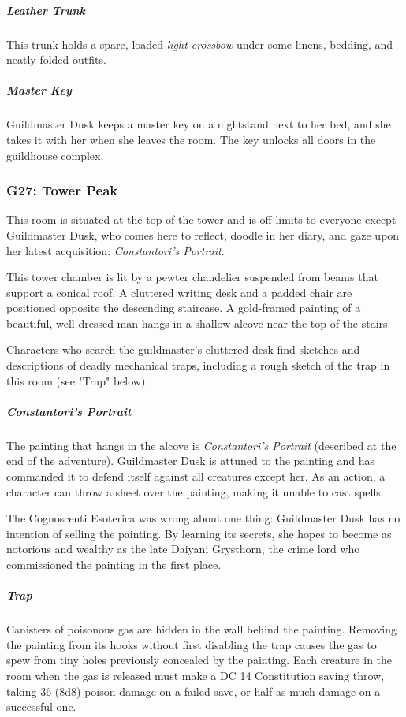 \documentclass[10pt,a4paper,twoside,bg=print,twocolumn,openany,nodeprecatedcode]{dndbook}
\begin{document}
\subparagraph{Leather Trunk}
This trunk holds a spare, loaded \textit{light crossbow} under some linens, bedding, and neatly folded outfits.

\subparagraph{Master Key}
Guildmaster Dusk keeps a master key on a nightstand next to her bed, and she takes it with her when she leaves the room. The key unlocks all doors in the guildhouse complex.

\subsubsection{G27: Tower Peak}
This room is situated at the top of the tower and is off limits to everyone except Guildmaster Dusk, who comes here to reflect, doodle in her diary, and gaze upon her latest acquisition: \textit{Constantori's Portrait}.

\begin{DndReadAloud}{}
This tower chamber is lit by a pewter chandelier suspended from beams that support a conical roof. A cluttered writing desk and a padded chair are positioned opposite the descending staircase. A gold-framed painting of a beautiful, well-dressed man hangs in a shallow alcove near the top of the stairs.

\end{DndReadAloud}

Characters who search the guildmaster's cluttered desk find sketches and descriptions of deadly mechanical traps, including a rough sketch of the trap in this room (see "Trap" below).

\subparagraph{Constantori's Portrait}
The painting that hangs in the alcove is \textit{Constantori's Portrait} (described at the end of the adventure). Guildmaster Dusk is attuned to the painting and has commanded it to defend itself against all creatures except her. As an action, a character can throw a sheet over the painting, making it unable to cast spells.

The Cognoscenti Esoterica was wrong about one thing: Guildmaster Dusk has no intention of selling the painting. By learning its secrets, she hopes to become as notorious and wealthy as the late Daiyani Grysthorn, the crime lord who commissioned the painting in the first place.

\subparagraph{Trap}
Canisters of poisonous gas are hidden in the wall behind the painting. Removing the painting from its hooks without first disabling the trap causes the gas to spew from tiny holes previously concealed by the painting. Each creature in the room when the gas is released must make a DC 14 Constitution saving throw, taking 36 (8d8) poison damage on a failed save, or half as much damage on a successful one.
\end{document}
